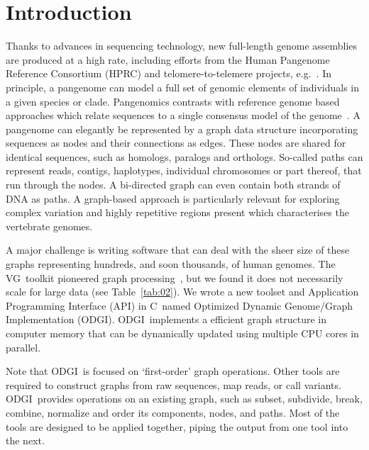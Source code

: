 \documentclass{bioinfo}
\newcommand{\odgi}{ODGI}
\newcommand{\vg}{VG}
\newcommand{\Rplus}{\protect\hspace{-.1em}\protect\raisebox{.35ex}{\smaller{\smaller\textbf{+}}}}
\newcommand{\Cpp}{\mbox{C\Rplus\Rplus}\xspace}
\begin{document}
    \section{Introduction}

    Thanks to advances in sequencing technology, new full-length
    genome assemblies are produced at a high rate, including efforts
    from the Human Pangenome Reference Consortium (HPRC) and
    telomere-to-telemere projects, e.g.~\citep{Miga:2020}. In
    principle, a pangenome can model a full set of genomic elements of
    individuals in a given species or clade. Pangenomics contrasts
    with reference genome based approaches which relate sequences to a
    single consensus model of the genome~\citep{Eizenga:2020}. A
    pangenome can elegantly be represented by a graph data structure
    incorporating sequences as nodes and their connections as
    edges. These nodes are shared for identical sequences, such as
    homologs, paralogs and orthologs. So-called paths can represent
    reads, contigs, haplotypes, individual chromosomes or part
    thereof, that run through the nodes. A bi-directed graph can even
    contain both strands of DNA as paths. A graph-based approach is
    particularly relevant for exploring complex variation and highly
    repetitive regions present which characterises the vertebrate
    genomes.

    A major challenge is writing software that can deal with the sheer
    size of these graphs representing hundreds, and soon thousands, of
    human genomes. The \vg\ toolkit pioneered graph
    processing~\citep{vgtools,Eizenga:2020b}, but we found it does not
    necessarily scale for large data (see Table~\ref{tab:02}). We
    wrote a new toolset and Application Programming Interface (API) in
    \Cpp\ named Optimized Dynamic Genome/Graph Implementation (ODGI).
    \odgi\ implements a efficient graph structure in computer memory
    that can be dynamically updated using multiple CPU cores in
    parallel.

    Note that \odgi\ is focused on `first-order' graph
    operations. Other tools are required to construct graphs from raw
    sequences, map reads, or call variants. \odgi\ provides
    operations on an existing graph, such as subset, subdivide, break,
    combine, normalize and order its components, nodes, and
    paths. Most of the tools are designed to be applied together,
    piping the output from one tool into the next.


    
\end{document}
